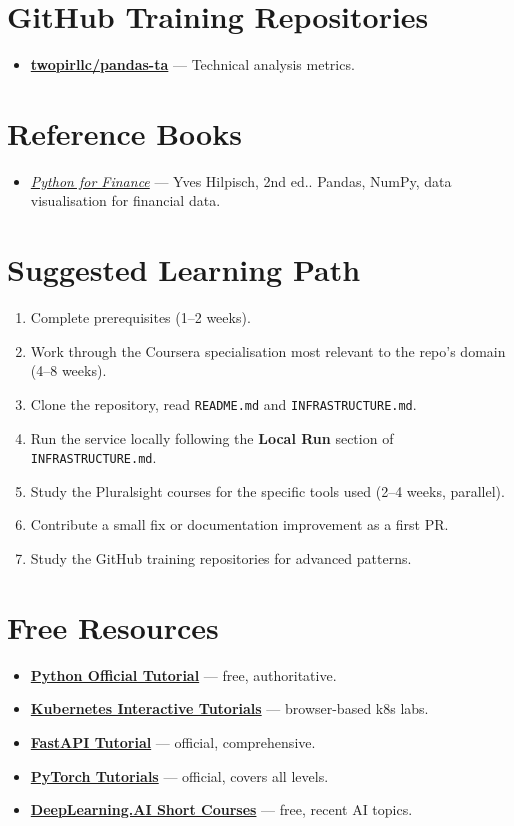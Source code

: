 \documentclass[11pt,a4paper]{article}
\begin{document}
\section{GitHub Training Repositories}
\begin{itemize}[leftmargin=1.5em]
  \item \href{https://github.com/twopirllc/pandas-ta}{\textbf{twopirllc/pandas-ta}} — Technical analysis metrics.
\end{itemize}

\section{Reference Books}
\begin{itemize}[leftmargin=1.5em]
  \item \href{https://www.oreilly.com/library/view/python-for-finance/9781492024323/}{\textit{Python for Finance}} — Yves Hilpisch, 2nd ed.. Pandas, NumPy, data visualisation for financial data.
\end{itemize}

\section{Suggested Learning Path}
\begin{enumerate}
  \item Complete prerequisites (1--2 weeks).
  \item Work through the Coursera specialisation most relevant to the repo's domain (4--8 weeks).
  \item Clone the repository, read \texttt{README.md} and \texttt{INFRASTRUCTURE.md}.
  \item Run the service locally following the \textbf{Local Run} section of \texttt{INFRASTRUCTURE.md}.
  \item Study the Pluralsight courses for the specific tools used (2--4 weeks, parallel).
  \item Contribute a small fix or documentation improvement as a first PR.
  \item Study the GitHub training repositories for advanced patterns.
\end{enumerate}

\section{Free Resources}
\begin{itemize}
  \item \href{https://docs.python.org/3/tutorial/}{\textbf{Python Official Tutorial}} — free, authoritative.
  \item \href{https://kubernetes.io/docs/tutorials/}{\textbf{Kubernetes Interactive Tutorials}} — browser-based k8s labs.
  \item \href{https://fastapi.tiangolo.com/tutorial/}{\textbf{FastAPI Tutorial}} — official, comprehensive.
  \item \href{https://pytorch.org/tutorials/}{\textbf{PyTorch Tutorials}} — official, covers all levels.
  \item \href{https://www.deeplearning.ai/short-courses/}{\textbf{DeepLearning.AI Short Courses}} — free, recent AI topics.
\end{itemize}
\end{document}
